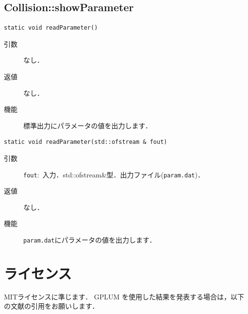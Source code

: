 \documentclass[12pt,a4paper,dvipdfmx]{jsarticle}
\newcommand{\ourcode}{GPLUM\xspace}
\begin{document}
\subsection{Collision::showParameter}

\begin{screen}
\begin{verbatim}
static void readParameter()
\end{verbatim}
\end{screen}

\begin{description}
\item[引数]

なし．

\item[返値]

なし．
\item[機能]

標準出力にパラメータの値を出力します．

\end{description}


\begin{screen}
\begin{verbatim}
static void readParameter(std::ofstream & fout)
\end{verbatim}
\end{screen}

\begin{description}
\item[引数]

\texttt{fout}:\ 入力．std::ofstream\&型．出力ファイル(\texttt{param.dat})．

\item[返値]

なし．

\item[機能]

\texttt{param.dat}にパラメータの値を出力します．

\end{description}



\section{ライセンス}

MITライセンスに準じます．
\ourcode を使用した結果を発表する場合は，以下の文献の引用をお願いします．
\end{document}
